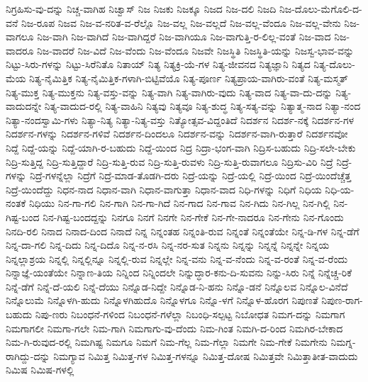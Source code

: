 {ನಿಗ್ರಹಿಸು-ವು-ದನ್ನು
ನಿಚ್ಚ-ವಾಗಿಹ
ನಿಚ್ವಾಸ್
ನಿಜ
ನಿಜಕು
ನಿಜಕ್ಕೂ
ನಿಜದ
ನಿಜ-ದಲಿ
ನಿಜದಿ
ನಿಜ-ದೊಲು-ಮೆಗೊಲಿ-ದ-ವನೆ
ನಿಜ-ರೂಪ
ನಿಜವ
ನಿಜ-ವ-ನರಿತ-ವ-ರೆಲ್ಲೊ
ನಿಜ-ವಲ್ಲ
ನಿಜ-ವಲ್ಲದೆ
ನಿಜ-ವಲ್ಲ-ವೆಂದೂ
ನಿಜ-ವಲ್ಲ-ವೇನು
ನಿಜ-ವಾಗಲೂ
ನಿಜ-ವಾಗಿ
ನಿಜ-ವಾಗಿದೆ
ನಿಜ-ವಾಗಿದ್ದರೆ
ನಿಜ-ವಾಗಿಯೂ
ನಿಜ-ವಾಗುತ್ತಿ-ರ-ಲಿಲ್ಲ-ವಂತೆ
ನಿಜ-ವಾದ
ನಿಜ-ವಾದರೂ
ನಿಜ-ವಾದರೆ
ನಿಜ-ವಿದೆ
ನಿಜ-ವೆಂದು
ನಿಜ-ವೆಂದೂ
ನಿಜವೇ
ನಿಜಸ್ಥಿತಿ
ನಿಜಸ್ಥಿತಿ-ಯನ್ನು
ನಿಜಸ್ವ-ಭಾವ-ವನ್ನು
ನಿಟ್ಟು-ಸಿರು-ಗಳನ್ನು
ನಿಟ್ಟು-ಸಿರೆನಿತೊ
ನಿತಾಯ್
ನಿತ್ಯ
ನಿತ್ಯಕ್ರಿ-ಯೆ-ಗಳ
ನಿತ್ಯ-ಜೀವನದ
ನಿತ್ಯಜ್ಞಾನಿ
ನಿತ್ಯದ
ನಿತ್ಯ-ದೊಲು-ಮೆಯ
ನಿತ್ಯ-ನೈಮಿತ್ತಿಕ
ನಿತ್ಯ-ನೈಮಿತ್ತಿಕ-ಗಳಾಗಿ-ಬಿಟ್ಟಿವೆಯೊ
ನಿತ್ಯ-ಪೂರ್ಣ
ನಿತ್ಯಪ್ರಾಯ-ವಾಗಿರು-ವಂತೆ
ನಿತ್ಯ-ಮಸ್ಮತ್
ನಿತ್ಯ-ಮುಕ್ತ
ನಿತ್ಯ-ಮುಕ್ತನು
ನಿತ್ಯ-ವಸ್ತು-ವನ್ನು
ನಿತ್ಯ-ವಾಗಿ
ನಿತ್ಯ-ವಾಗಿರು-ವುದು
ನಿತ್ಯ-ವಾದ
ನಿತ್ಯ-ವಾ-ದು-ದನ್ನು
ನಿತ್ಯ-ವಾದುದನ್ನೇ
ನಿತ್ಯ-ವಾದುದ-ರಲ್ಲಿ
ನಿತ್ಯ-ವಾಹಿನಿ
ನಿತ್ಯವು
ನಿತ್ಯವೂ
ನಿತ್ಯ-ಶುದ್ಧ
ನಿತ್ಯ-ಸತ್ಯ-ವನ್ನು
ನಿತ್ಯಾತ್ಮ-ನಾದ
ನಿತ್ಯಾ-ನಂದ
ನಿತ್ಯಾ-ನಂದಸ್ವಾಮಿ-ಗಳು
ನಿತ್ಯಾ-ನಿತ್ಯ
ನಿತ್ಯಾ-ನಿತ್ಯ-ವಸ್ತು
ನಿತ್ಯೋತ್ಸವ-ವಿದ್ದಂತಿದೆ
ನಿದರ್ಶನ
ನಿದರ್ಶ-ನಕ್ಕೆ
ನಿದರ್ಶನ-ಗಳ
ನಿದರ್ಶನ-ಗಳನ್ನು
ನಿದರ್ಶನ-ಗಳಿವೆ
ನಿದರ್ಶನ-ದಿಂದಲೂ
ನಿದರ್ಶನ-ವನ್ನು
ನಿದರ್ಶನ-ವಾಗಿ-ರುತ್ತಾರೆ
ನಿದರ್ಶನವೋ
ನಿದ್ದೆ
ನಿದ್ದೆ-ಯನ್ನು
ನಿದ್ದೆ-ಯಾಗಿ-ರ-ಬಹುದು
ನಿದ್ದೆ-ಯಿಂದ
ನಿದ್ರ
ನಿದ್ರಾ-ಭಂಗ-ವಾಗಿ
ನಿದ್ರಿಸ-ಬಹುದು
ನಿದ್ರಿ-ಸಲೇ-ಬೇಕು
ನಿದ್ರಿ-ಸುತ್ತಿದ್ದ
ನಿದ್ರಿ-ಸುತ್ತಿದ್ದಾರೆ
ನಿದ್ರಿ-ಸುತ್ತಿ-ರುವ
ನಿದ್ರಿ-ಸುತ್ತಿ-ರುವಳು
ನಿದ್ರಿ-ಸುತ್ತಿ-ರುವಾಗಲೂ
ನಿದ್ರಿಸು-ವಿರಿ
ನಿದ್ರೆ
ನಿದ್ರೆ-ಗಳನ್ನು
ನಿದ್ರೆ-ಗಳನ್ನೆಲ್ಲಾ
ನಿದ್ರೆಗೆ
ನಿದ್ರೆ-ಮಾಡ-ತೊಡಗಿ-ದರು
ನಿದ್ರೆ-ಯನ್ನು
ನಿದ್ರೆ-ಯಲ್ಲಿ
ನಿದ್ರೆ-ಯಿಂದ
ನಿದ್ರೆ-ಯಿಂದೆಚ್ಚೆತ್ತ
ನಿದ್ರೆ-ಯಿಂದೆದ್ದು
ನಿಧನ-ನಾದ
ನಿಧಾನ-ವಾಗಿ
ನಿಧಾನ-ವಾಗುತ್ತಾ
ನಿಧಾನ-ವಾದ
ನಿಧಿ-ಗಳನ್ನು
ನಿಧಿಗೆ
ನಿಧಿಯ
ನಿಧಿ-ಯ-ನಂತಕೆ
ನಿಧಿಯು
ನಿನ-ಗಾ-ಗಲಿ
ನಿನ-ಗಾಗಿ
ನಿನ-ಗಾ-ಗಿದೆ
ನಿನ-ಗಾದ
ನಿನ-ಗಾವ
ನಿನ-ಗಿದು
ನಿನ-ಗಿಲ್ಲ
ನಿನ-ಗಿಲ್ಲಿ
ನಿನ-ಗಿಷ್ಟ-ಬಂದ
ನಿನ-ಗಿಷ್ಟ-ಬಂದದ್ದನ್ನು
ನಿನಗೂ
ನಿನಗೆ
ನಿನಗೇ
ನಿನ-ಗೇಕೆ
ನಿನ-ಗೇ-ನಾದರೂ
ನಿನ-ಗೇನು
ನಿನ-ಗೊಂದು
ನಿನದಿ-ರಲಿ
ನಿನಾದ
ನಿನಾದ-ದಿಂದ
ನಿನಾದೆ
ನಿನ್ನ
ನಿನ್ನಂತಹ
ನಿನ್ನಂತಿ-ರುವ
ನಿನ್ನಂತೆ
ನಿನ್ನಂತೆಯೇ
ನಿನ್ನ-ಡಿ-ಗಳ
ನಿನ್ನ-ಡೆಗೆ
ನಿನ್ನ-ದಾ-ಗಲಿ
ನಿನ್ನ-ದಿದು
ನಿನ್ನ-ದಿದೊ
ನಿನ್ನ-ನ-ರಸಿ
ನಿನ್ನ-ನರ-ಸುತ
ನಿನ್ನನು
ನಿನ್ನನ್ನು
ನಿನ್ನನ್ನೆ
ನಿನ್ನನ್ನೇ
ನಿನ್ನಯ
ನಿನ್ನಲ್ಲಾಶ್ರಯ
ನಿನ್ನಲ್ಲಿ
ನಿನ್ನಲ್ಲಿನ್ನೂ
ನಿನ್ನಲ್ಲಿ-ರುವ
ನಿನ್ನಲ್ಲೇ
ನಿನ್ನ-ವನು
ನಿನ್ನ-ವ-ನೆಂದು
ನಿನ್ನ-ವ-ರಂತೆ
ನಿನ್ನ-ವ-ರೆಂದು
ನಿನ್ನಾಜ್ಞೆ-ಯಂತೆಯೇ
ನಿನ್ನಾಣ-ತಿಯ
ನಿನ್ನಿಂದ
ನಿನ್ನಿಂದಲೇ
ನಿನ್ನುದ್ಧಾರ-ಕನು-ದಿ-ಸುವನು
ನಿನ್ನು-ಸಿರು
ನಿನ್ನೆ
ನಿನ್ನೆಚ್ಚ-ರಿಕೆ
ನಿನ್ನೆ-ಡೆಗೆ
ನಿನ್ನೆ-ದೆ-ಯಲಿ
ನಿನ್ನೆ-ದೆಯು
ನಿನ್ನೊಡ-ನಿದ್ದೇ
ನಿನ್ನೊಡ-ನಿ-ಹನು
ನಿನ್ನೊ-ಡನೆ
ನಿನ್ನೊಲವ
ನಿನ್ನೊಲ-ವಿನೆದೆ
ನಿನ್ನೊಲುಮೆ
ನಿನ್ನೊಳಗಿ-ಹುದು
ನಿನ್ನೊಳಗಿಹುದೊ
ನಿನ್ನೊಳಗೂ
ನಿನ್ನೊ-ಳಗೆ
ನಿನ್ನೊಳ-ಹೊರಗ
ನಿಪುಣತೆ
ನಿಪುಣ-ರಾಗ-ಬಹುದು
ನಿಪು-ಣರು
ನಿಬಂಧನೆ-ಗಳಿಂದ
ನಿಬಂಧನೆ-ಗಳೆಲ್ಲಾ
ನಿಬಂಧಿ-ಸಲ್ಪಟ್ಟ
ನಿಬೋಧತ
ನಿಮಗ-ದನ್ನು
ನಿಮಗಾಗ
ನಿಮಗಾಗಲೀ
ನಿಮಗಾ-ಗಲೇ
ನಿಮ-ಗಾಗಿ
ನಿಮಗಾಗು-ವು-ದೆಂದು
ನಿಮ-ಗಿಂತ
ನಿಮಗಿ-ದ-ರಿಂದ
ನಿಮಗಿರ-ಬೇಕಾದ
ನಿಮ-ಗಿ-ರುವುದ-ರಲ್ಲಿ
ನಿಮಗಿಷ್ಟ
ನಿಮಗೂ
ನಿಮಗೆ
ನಿಮ-ಗೆಲ್ಲ
ನಿಮ-ಗೆಲ್ಲಾ
ನಿಮಗೇ
ನಿಮ-ಗೇಕೆ
ನಿಮಗೇನು
ನಿಮಗ್ನ-ರಾಗಿದ್ದು-ದನ್ನು
ನಿಮಗ್ಯಾವ
ನಿಮಿತ್ತ
ನಿಮಿತ್ತ-ಗಳ
ನಿಮಿತ್ತ-ಗಳನ್ನೂ
ನಿಮಿತ್ತ-ದೋಷ
ನಿಮಿತ್ತವೇ
ನಿಮಿತ್ತಾತೀತ-ವಾದುದು
ನಿಮಿಷ
ನಿಮಿಷ-ಗಳಲ್ಲಿ
}
